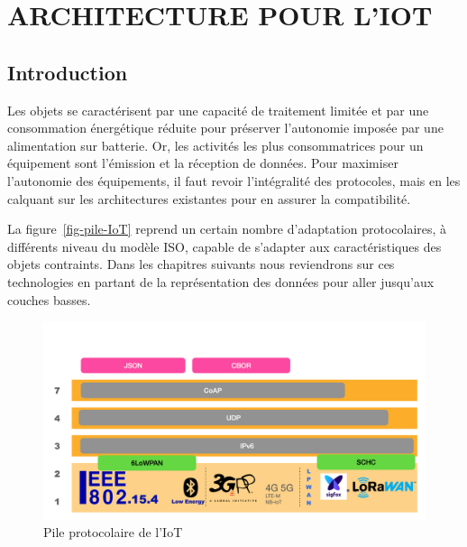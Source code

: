\cleardoublepage

\chapter{ARCHITECTURE POUR L'IOT}

\section{Introduction}
  
    \vspace{1em}
   
 \begin{figure}
\end{figure}

Les objets se caractérisent 
par 
une capacité
de traitement limitée et par une consommation énergétique réduite pour préserver l’autonomie imposée par une alimentation sur batterie.
Or, les activités les plus consommatrices pour un équipement sont l’émission et la réception de données. 
Pour maximiser l’autonomie des équipements, il faut revoir l’intégralité des protocoles, mais en les calquant sur les architectures existantes pour en assurer la compatibilité. 

La figure~\vref{fig-pile-IoT} reprend un certain nombre d'adaptation protocolaires, à différents niveau du modèle \ac{ISO}, capable de s'adapter aux caractéristiques des objets contraints. Dans les chapitres suivants nous reviendrons sur ces technologies en partant de la représentation des données pour aller jusqu'aux couches basses.

\begin{figure}[tbp]
\centerline{\includegraphics[width=1\columnwidth]{Pictures/Capture17.png}}
\caption{Pile protocolaire de l'IoT}
\label{fig-pile-IoT}
\end{figure}

